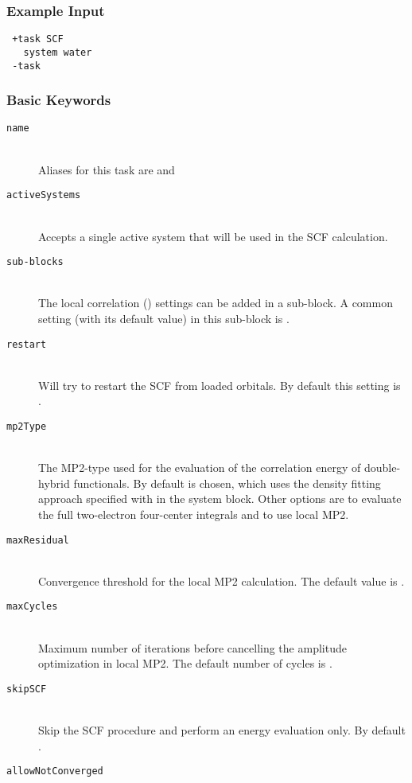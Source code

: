 \subsubsection{Example Input}
\begin{lstlisting}
 +task SCF
   system water
 -task
\end{lstlisting}
\subsubsection{Basic Keywords}
\begin{description}
	\item[\texttt{name}]\hfill \\
	Aliases for this task are  and 
	\item[\texttt{activeSystems}]\hfill \\
	Accepts a single active system that will be used in the SCF calculation.
	\item[\texttt{sub-blocks}]\hfill \\
	The local correlation () settings can be added in a sub-block. A common setting (with its default value) in this sub-block is .	
	\item[\texttt{restart}]\hfill \\
	Will try to restart the SCF from loaded orbitals. By default this setting is .
	\item[\texttt{mp2Type}]\hfill \\
	The MP2-type used for the evaluation of the correlation energy of double-hybrid functionals. By default  is chosen, which uses the density fitting approach specified with  in the system block. Other options are  to evaluate the full two-electron four-center integrals and  to use local MP2.
	\item[\texttt{maxResidual}]\hfill \\
	Convergence threshold for the local MP2 calculation. The default value is .
	\item[\texttt{maxCycles}]\hfill \\
	Maximum number of iterations before cancelling the amplitude optimization in local MP2. The default number of cycles is .
	\item[\texttt{skipSCF}]\hfill \\
	Skip the SCF procedure and perform an energy evaluation only. By default .
	\item[\texttt{allowNotConverged}]\hfill \\

\end{description}
